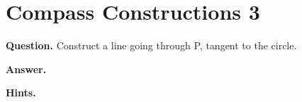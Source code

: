 \documentclass{article}
\begin{document}
\section*{Compass Constructions 3}
\textbf{Question.} Construct a line going through P, tangent to the circle.

\textbf{Answer.} 

\textbf{Hints.}
\begin{itemize}

\end{itemize}
\end{document}
